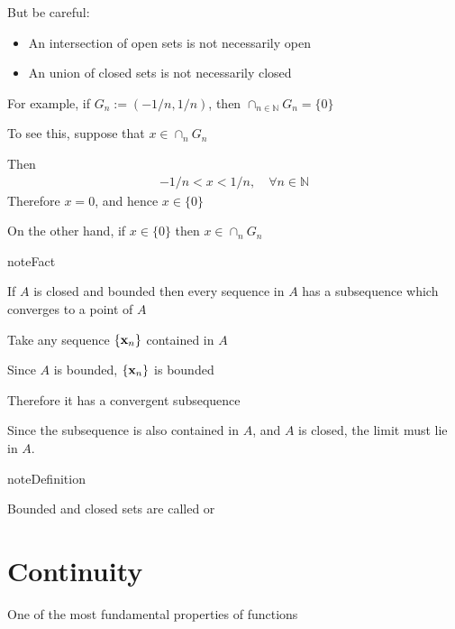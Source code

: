 \documentclass[letterpaper,10pt,english]{jupyterBook}
\begin{document}
\sphinxAtStartPar
But be careful:
\begin{itemize}
\item {} 
\sphinxAtStartPar
An  intersection of open sets is not necessarily open

\item {} 
\sphinxAtStartPar
An  union of closed sets is not necessarily closed

\end{itemize}

\sphinxAtStartPar
For example, if \(G_n := (-1/n, 1/n)\), then \(\cap_{n \in \mathbb{N}} G_n = \{0\} \)

\sphinxAtStartPar
To see this, suppose that \(x \in \cap_n G_n\)

\sphinxAtStartPar
Then
\begin{equation*}
\begin{split}
%
-1/n < x < 1/n, \quad \forall n \in \mathbb{N}
%
\end{split}
\end{equation*}
\sphinxAtStartPar
Therefore \(x = 0\), and hence \(x \in \{0\}\)

\sphinxAtStartPar
On the other hand, if \(x \in \{0\}\) then \(x \in \cap_n G_n\)

\begin{sphinxadmonition}{note}{Fact}

\sphinxAtStartPar
If \(A\) is closed and bounded then every sequence in
\(A\) has a subsequence which converges to a point of \(A\)
\end{sphinxadmonition}

\sphinxAtStartPar
Take any sequence \(\{{\bf x}_n\}\) contained in \(A\)

\sphinxAtStartPar
Since \(A\) is bounded, \(\{{\bf x}_n\}\) is bounded

\sphinxAtStartPar
Therefore it has a convergent subsequence

\sphinxAtStartPar
Since the subsequence is also contained in \(A\),
and \(A\) is closed, the limit must lie in \(A\).

\begin{sphinxadmonition}{note}{Definition}

\sphinxAtStartPar
Bounded and closed sets are called  or 
\end{sphinxadmonition}


\section{Continuity}
\label{\detokenize{06.optimization_fundamentals:continuity}}
\sphinxAtStartPar
One of the most fundamental properties of functions
\end{document}

